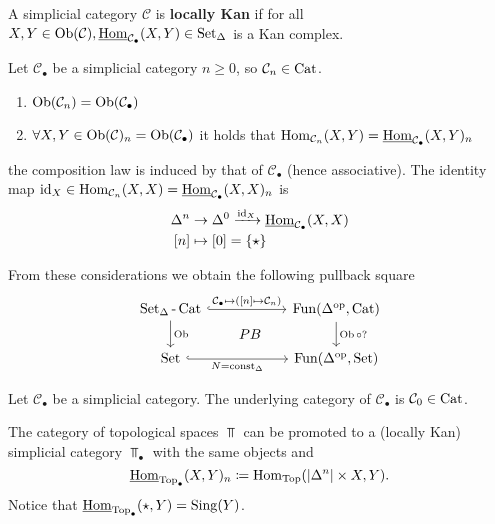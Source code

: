 \begin{defi}
	A simplicial category $ \mathcal{ C } $ is \textbf{locally Kan} if for all $ X ,Y \in \operatorname{Ob} ( \mathcal{ C } ) , \underline{ \operatorname{Hom} }_{ \mathcal{ C }_\bullet } ( X , Y ) \in \operatorname{Set}_{\Delta} $ is a Kan complex. 
\end{defi}

\begin{construction}
	Let $ \mathcal{ C }_\bullet $ be a simplicial category $ n \geq 0 $, so $ \mathcal{ C }_n \in \operatorname{Cat} $.
	\begin{enumerate}
		\item 
		$ \operatorname{Ob} (\mathcal{ C }_n ) = \operatorname{Ob} ( \mathcal{ C }_\bullet ) $
		
		\item 
		$ \forall X , Y \in \operatorname{Ob}( \mathcal{ C } )_n = \operatorname{Ob} ( \mathcal{ C }_\bullet ) $ it holds that 
		$ \operatorname{Hom}_{ \mathcal{ C }_n } ( X ,Y ) = \underline{ \operatorname{Hom} }_{ \mathcal{ C }_\bullet } ( X , Y )_n $
	\end{enumerate}
	the composition law is induced by that of $ \mathcal{ C }_\bullet $ (hence associative).
	The identity map $ \operatorname{id}_X \in \operatorname{Hom}_{ \mathcal{ C }_n } ( X , X ) = \underline{ \operatorname{Hom} }_{ \mathcal{ C }_\bullet } ( X , X )_n $ is 
	\begin{align*}
		\Delta^n 
		&\to
		\Delta^0 
		\xrightarrow{ \operatorname{id}_X } 
		\underline{ \operatorname{Hom} }_{ \mathcal{ C }_\bullet } ( X , X ) 
		\\
		[n]
		&\mapsto
		[0] = \{ \star \}
	\end{align*}
\end{construction}

From these considerations we obtain the following pullback square
\[
\begin{tikzcd}[column sep=2cm]
	\SetD\text{-}\Cat 
	\ar[r, hook, " { \mathcal{ C }_\bullet \mapsto ( [ n ] \mapsto \mathcal{ C }_n ) }"]
	\ar[d, " \Ob "]
		\ar[d, phantom,"PB",shift left=2cm]
	&
	\Fun ( \Delta^{\op} , \Cat )
	\ar[d, "{ \Ob \circ ? }"]
	\\
	\Set
	\ar[r, hook, "{ N = \const_\Delta }"']
	&
	\Fun ( \Delta^{\op} ,\Set )
\end{tikzcd}
\]

\begin{defi}
	Let $ \mathcal{ C }_\bullet $ be a simplicial category.
	The underlying category of $ \mathcal{ C }_\bullet $ is $ \mathcal{ C }_0 \in \operatorname{Cat} $. 
\end{defi}

\begin{exmp}
	The category of topological spaces $ \Top $ can be promoted to a (locally Kan) simplicial category $\Top_\bullet $ with the same objects and 
	\[
		\underline{\operatorname{Hom}}_{\operatorname{Top}_\bullet} ( X , Y )_n 
		\coloneqq 
		\operatorname{Hom}_{ \operatorname{Top} } ( \lvert \Delta^n \rvert \times X , Y ).
	\]
	Notice that $ \underline{ \operatorname{Hom} }_{ \operatorname{Top}_\bullet } ( \star , Y ) = \operatorname{Sing}( Y ) $.
\end{exmp}

